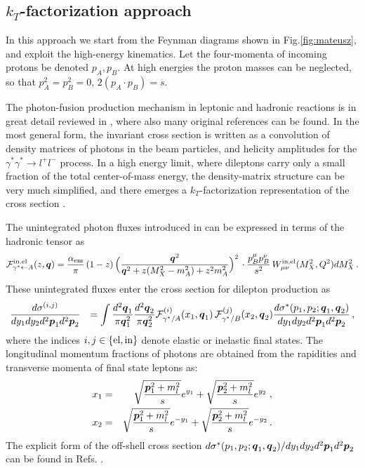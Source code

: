 

\subsection{$k_T$-factorization approach}

In this approach we start from the Feynman diagrams shown in Fig.\ref{fig:mateusz},
and exploit the high-energy kinematics.
Let the four-momenta of incoming protons be denoted $p_A,p_B$. At high energies 
the proton masses can be neglected, so that $p_A^2 = p_B^2 =0, \,  2 (p_A\cdot p_B) =s$.


The photon-fusion production mechanism in leptonic and hadronic reactions
is in great detail reviewed in \cite{Budnev:1974de}, where also many original
references can be found. In the most general form, the invariant cross section
is written as a convolution of density matrices of photons in the beam particles,
and helicity amplitudes for the $\gamma^* \gamma^* \to l^+ l^-$ process.
In a high energy limit, where dileptons carry only a small fraction of the 
total center-of-mass energy, the density-matrix structure can be very much
simplified, and there emerges a $k_T$-factorization representation of the
cross section \cite{daSilveira:2014jla}.

The unintegrated photon fluxes introduced in \cite{daSilveira:2014jla}
can be expressed in terms of the hadronic tensor as 
\begin{eqnarray}
 {\cal{F}}^{{\rm{in.el}}}_{\gamma^* \leftarrow A} (z,\mbox{\boldmath $q$}) = {\alpha_{\rm{em}}\over \pi}  \, (1-z) \, 
\Big( {\mbox{\boldmath $q$}^2 \over \mbox{\boldmath $q$}^2 + z (M_X^2 - m_A^2) + z^2 m_A^2  }\Big)^2  \, 
\cdot {p_B^\mu p_B^\nu \over s^2} \, W^{\rm{in,el}}_{\mu \nu}(M_X^2,Q^2) dM_X^2 \, . \nonumber \\
\end{eqnarray}
These unintegrated fluxes enter the cross section for dilepton production as
\begin{eqnarray}
 {d \sigma^{(i,j)} \over dy_1 dy_2 d^2\mbox{\boldmath $p$}_1 d^2\mbox{\boldmath $p$}_2} &&=  \int  {d^2 \mbox{\boldmath $q$}_1 \over \pi \mbox{\boldmath $q$}_1^2} {d^2 \mbox{\boldmath $q$}_2 \over \pi \mbox{\boldmath $q$}_2^2}  
 {\cal{F}}^{(i)}_{\gamma^*/A}(x_1,\mbox{\boldmath $q$}_1) \, {\cal{F}}^{(j)}_{\gamma^*/B}(x_2,\mbox{\boldmath $q$}_2) 
{d \sigma^*(p_1,p_2;\mbox{\boldmath $q$}_1,\mbox{\boldmath $q$}_2) \over dy_1 dy_2 d^2\mbox{\boldmath $p$}_1 d^2\mbox{\boldmath $p$}_2} \, , \nonumber \\ 
\label{eq:kt-fact}
\end{eqnarray}
where the indices $i,j \in \{\rm{el}, \rm{in} \}$ denote elastic or inelastic final states.
The longitudinal momentum fractions of photons are obtained from the rapidities 
and transverse momenta of final state leptons as:
\begin{eqnarray}
x_1 &=& \sqrt{ {\mbox{\boldmath $p$}_1^2 + m_l^2 \over s}} e^{y_1} +  \sqrt{ {\mbox{\boldmath $p$}_2^2 +
    m_l^2 \over s}} e^{y_2} 
\; , \nonumber \\
x_2 &=& \sqrt{ {\mbox{\boldmath $p$}_1^2 + m_l^2 \over s}} e^{-y_1} +  \sqrt{ {\mbox{\boldmath $p$}_2^2 + m_l^2 \over s}} e^{-y_2} \, .
\end{eqnarray}
The explicit form of the off-shell cross section $d \sigma^*(p_1,p_2;\mbox{\boldmath $q$}_1,\mbox{\boldmath $q$}_2)/ dy_1 dy_2 d^2\mbox{\boldmath $p$}_1 d^2\mbox{\boldmath $p$}_2$ can be found in
Refs. \cite{daSilveira:2014jla,Luszczak:2015aoa}. 


